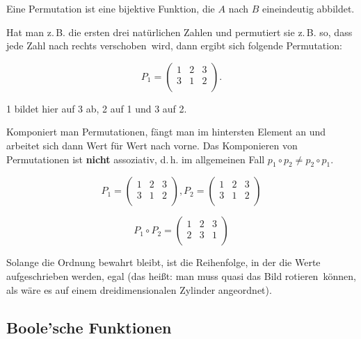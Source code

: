 \documentclass{scrartcl}
\begin{document}
Eine Permutation ist eine bijektive Funktion, die $A$ nach $B$ eineindeutig abbildet.

Hat man z.\,B. die ersten drei natürlichen Zahlen und permutiert sie z.\,B. so, dass jede Zahl \frq nach rechts
verschoben\flq\ wird, dann ergibt sich folgende Permutation:

\begin{equation}
	P_1 = \begin{pmatrix*}
		1 & 2 & 3\\
		3 & 1 & 2\\
	\end{pmatrix*}.
\end{equation}

1 bildet hier auf 3 ab, 2 auf 1 und 3 auf 2. 

Komponiert man Permutationen, fängt man im hintersten Element an und arbeitet sich dann Wert für Wert nach vorne.
Das Komponieren von Permutationen ist \textbf{nicht} assoziativ, d.\,h. im allgemeinen Fall $p_1 \circ p_2 \not= p_2 \circ p_1$.

\begin{equation}
	P_1 = \begin{pmatrix*}
		1 & 2 & 3\\
		3 & 1 & 2\\
	\end{pmatrix*}, 
	P_2 = \begin{pmatrix*}
		1 & 2 & 3\\
		3 & 1 & 2\\
	\end{pmatrix*}
\end{equation}

\begin{equation}
	P_1 \circ P_2 = \begin{pmatrix*}
		1 & 2 & 3 \\
		2 & 3 & 1\\
	\end{pmatrix*}
\end{equation}

Solange die Ordnung bewahrt bleibt, ist die Reihenfolge, in der die Werte aufgeschrieben werden,
egal (das heißt: man muss quasi das Bild \frq rotieren\flq\ können, als wäre es auf einem dreidimensionalen
Zylinder angeordnet).

\subsection{Boole'sche Funktionen}
\end{document}
